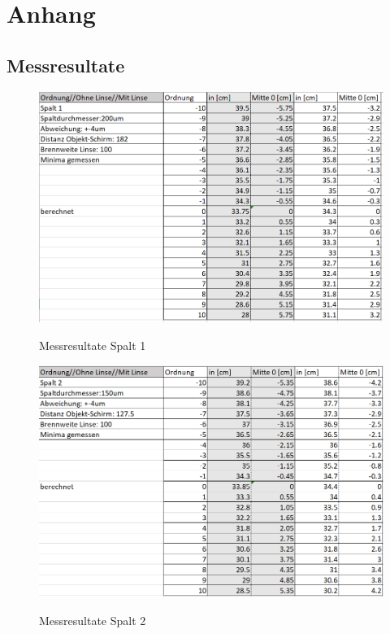 \chapter*{Anhang}
\thispagestyle{fancy} 
\section{Messresultate}
\begin{figure}[h]
\centering
\includegraphics[width=\textwidth]{Bilder/messung1.png} 
\label{fig:messresultate}
\caption{Messresultate Spalt 1}
\end{figure}
\newpage

\begin{figure}[h]
\centering
\includegraphics[width=\textwidth]{Bilder/messung2.png} 
\label{fig:messresultate}
\caption{Messresultate Spalt 2}
\end{figure}
\newpage

